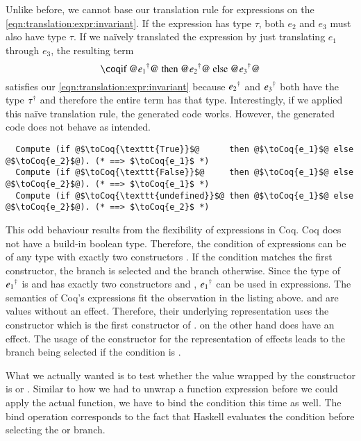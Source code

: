 Unlike before, we cannot base our translation rule for  expressions on the \ref{eqn:translation:expr:invariant}.
If the expression  has type $\tau$, both $e_2$ and $e_3$ must also have type $\tau$.
If we naïvely translated the expression by just translating $e_1$ through $e_3$, the resulting term
\[
  \coqM{if @$\toCoqX{e_1}$@ then @$\toCoqX{e_2}$@ else @$\toCoqX{e_3}$@}
\]
satisfies our \ref{eqn:translation:expr:invariant} because ${e_2}^{\dagger}$ and ${e_3}^{\dagger}$ both have the type ${\tau}^{\dagger}$ and therefore the entire term has that type.
Interestingly, if we applied this naïve translation rule, the generated code works.
However, the generated code does not behave as intended.
\begin{verbatim}
  Compute (if @$\toCoq{\texttt{True}}$@      then @$\toCoq{e_1}$@ else @$\toCoq{e_2}$@). (* ==> $\toCoq{e_1}$ *)
  Compute (if @$\toCoq{\texttt{False}}$@     then @$\toCoq{e_1}$@ else @$\toCoq{e_2}$@). (* ==> $\toCoq{e_1}$ *)
  Compute (if @$\toCoq{\texttt{undefined}}$@ then @$\toCoq{e_1}$@ else @$\toCoq{e_2}$@). (* ==> $\toCoq{e_2}$ *)
\end{verbatim}
This odd behaviour results from the flexibility of  expressions in Coq.
Coq does not have a build-in boolean type.
Therefore, the condition of  expressions can be of any type with exactly two constructors \cite[p.~48]{CoqDevTeam:2018}.
If the condition matches the first constructor, the  branch is selected and the  branch otherwise.
Since the type of ${e_1}^{\dagger}$ is  and  has exactly two constructors  and , ${e_1}^{\dagger}$ can be used in  expressions.
The semantics of Coq's  expressions fit the observation in the listing above.
 and  are values without an effect.
Therefore, their underlying representation uses the  constructor which is the first constructor of .
 on the other hand does have an effect.
The usage of the  constructor for the representation of effects leads to the  branch being selected if the condition is .

What we actually wanted is to test whether the value wrapped by the  constructor is  or .
Similar to how we had to unwrap a function expression before we could apply the actual function, we have to bind the condition this time as well.
The bind operation corresponds to the fact that Haskell evaluates the condition before selecting the  or  branch.

